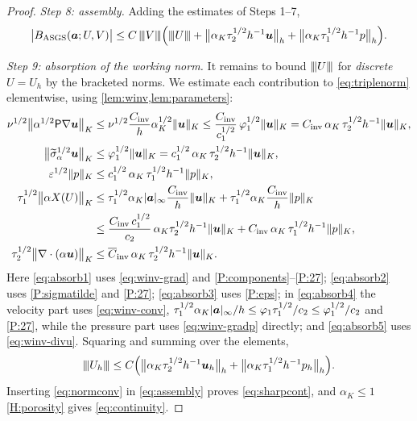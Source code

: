 \begin{proof}
\medskip\noindent\emph{Step 8: assembly.}
Adding the estimates of Steps 1--7,
\begin{equation}\label{eq:assembly}
  \bigl\lvert B_{\mathrm{ASGS}} (\boldsymbol{a};U,V)\bigr\rvert
  \le C\,{\lvert\kern-0.25ex\lvert\kern-0.25ex\lvert V \rvert\kern-0.25ex\rvert\kern-0.25ex\rvert}\Bigl({\lvert\kern-0.25ex\lvert\kern-0.25ex\lvert U \rvert\kern-0.25ex\rvert\kern-0.25ex\rvert}
  + \bigl\lVert\alpha_K\tau_2^{1/2}h^{-1}\boldsymbol{u}\bigr\rVert_h
  + \bigl\lVert\alpha_K\tau_1^{1/2}h^{-1}p\bigr\rVert_h\Bigr).
\end{equation}

\medskip\noindent\emph{Step 9: absorption of the working norm.}
It remains to bound ${\lvert\kern-0.25ex\lvert\kern-0.25ex\lvert U \rvert\kern-0.25ex\rvert\kern-0.25ex\rvert}$ for \emph{discrete} $U=U_h$ by the bracketed norms.
We estimate each contribution to \eqref{eq:triplenorm} elementwise, using
\cref{lem:winv,lem:parameters}:
\begin{align}
  \nu^{1/2}\bigl\lVert\alpha^{1/2}\mathsf{P}\nabla\boldsymbol{u}\bigr\rVert_K
  &\le \nu^{1/2}\frac{C_{\mathrm{inv}}}{h}\alpha_K^{1/2}\lVert\boldsymbol{u}\rVert_K
  \le \frac{C_{\mathrm{inv}}}{c_1^{1/2}}\,\varphi_1^{1/2}\lVert\boldsymbol{u}\rVert_K
  = C_{\mathrm{inv}}\,\alpha_K\,\tau_2^{1/2}h^{-1}\lVert\boldsymbol{u}\rVert_K,
  \label{eq:absorb1}\\
  \bigl\lVert\widetilde{\sigma}_{\alpha}^{1/2}\boldsymbol{u}\bigr\rVert_K
  &\le \varphi_1^{1/2}\lVert\boldsymbol{u}\rVert_K
  = c_1^{1/2}\,\alpha_K\,\tau_2^{1/2}h^{-1}\lVert\boldsymbol{u}\rVert_K,
  \label{eq:absorb2}\\
  \varepsilon^{1/2}\lVert p\rVert_K
  &\le c_1^{1/2}\,\alpha_K\,\tau_1^{1/2}h^{-1}\lVert p\rVert_K,
  \label{eq:absorb3}\\
  \tau_1^{1/2}\bigl\lVert\alpha X(U)\bigr\rVert_K
  &\le \tau_1^{1/2}\alpha_K|\boldsymbol{a}|_\infty\frac{C_{\mathrm{inv}}}{h}\lVert\boldsymbol{u}\rVert_K
   + \tau_1^{1/2}\alpha_K\frac{C_{\mathrm{inv}}}{h}\lVert p\rVert_K \nonumber\\
  &\le \frac{C_{\mathrm{inv}}\,c_1^{1/2}}{c_2}\,\alpha_K\tau_2^{1/2}h^{-1}\lVert\boldsymbol{u}\rVert_K
   + C_{\mathrm{inv}}\,\alpha_K\,\tau_1^{1/2}h^{-1}\lVert p\rVert_K,
  \label{eq:absorb4}\\
  \tau_2^{1/2}\bigl\lVert\nabla\cdot(\alpha\boldsymbol{u})\bigr\rVert_K
  &\le \overline{C}_{\mathrm{inv}}\,\alpha_K\,\tau_2^{1/2}h^{-1}\lVert\boldsymbol{u}\rVert_K .
  \label{eq:absorb5}
\end{align}
Here \eqref{eq:absorb1} uses \eqref{eq:winv-grad} and
\ref{P:components}--\ref{P:27}; \eqref{eq:absorb2} uses
\ref{P:sigmatilde} and \ref{P:27}; \eqref{eq:absorb3} uses \ref{P:eps};
in \eqref{eq:absorb4} the velocity part uses \eqref{eq:winv-conv},
$\tau_1^{1/2}\alpha_K|\boldsymbol{a}|_\infty/h \le \varphi_1\tau_1^{1/2}/c_2
\le\varphi_1^{1/2}/c_2$ and \ref{P:27}, while the pressure part uses
\eqref{eq:winv-gradp} directly; and \eqref{eq:absorb5} uses \eqref{eq:winv-divu}. Squaring
and summing over the elements,
\begin{equation}\label{eq:normconv}
  {\lvert\kern-0.25ex\lvert\kern-0.25ex\lvert U_h \rvert\kern-0.25ex\rvert\kern-0.25ex\rvert}
  \le C\Bigl(
  \bigl\lVert\alpha_K\tau_2^{1/2}h^{-1}\boldsymbol{u}_h\bigr\rVert_h
  + \bigl\lVert\alpha_K\tau_1^{1/2}h^{-1}p_h\bigr\rVert_h\Bigr).
\end{equation}
Inserting \eqref{eq:normconv} in \eqref{eq:assembly} proves \eqref{eq:sharpcont}, and
$\alpha_K\le1$ \cref{H:porosity} gives \eqref{eq:continuity}.
\end{proof}

